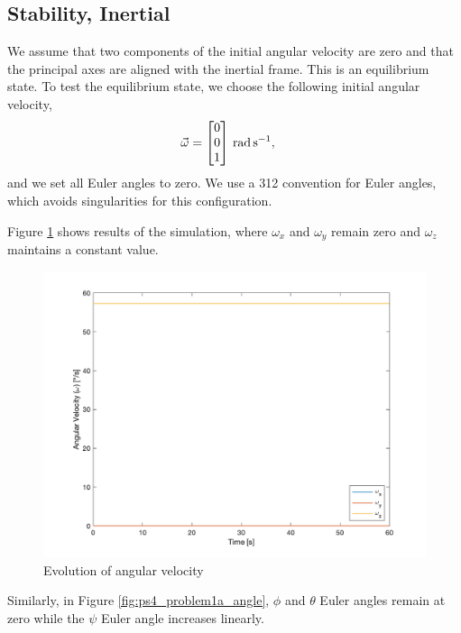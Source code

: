 \subsection{Stability, Inertial}
We assume that two components of the initial angular velocity are zero and that the principal axes are aligned with the inertial frame. This is an equilibrium state. To test the equilibrium state, we choose the following initial angular velocity,
\begin{align*}
\Vec{\omega} &= 
\qty[parse-numbers = false]{
    \begin{bmatrix}
    0 \\
    0 \\
    1 \\ 
    \end{bmatrix}
}{\radian\per\s},
\end{align*}
and we set all Euler angles to zero. We use a 312 convention for Euler angles, which avoids singularities for this configuration.

Figure \ref{fig:ps4_problem1a_angvel} shows results of the simulation, where $\omega_x$ and $\omega_y$ remain zero and $\omega_z$ maintains a constant value.

\begin{figure}[H]
\centering
\includegraphics[scale=0.6]{Images/ps4_problem1a_angvel.png}
\caption{Evolution of angular velocity}
\label{fig:ps4_problem1a_angvel}
\end{figure}

Similarly, in Figure \ref{fig:ps4_problem1a_angle}, $\phi$ and $\theta$ Euler angles remain at zero while the $\psi$ Euler angle increases linearly.

